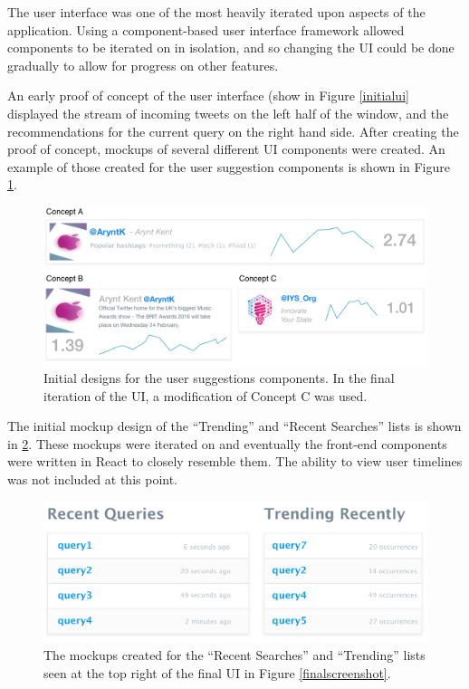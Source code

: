 \documentclass{l4proj}
\begin{document}
        The user interface was one of the most heavily iterated upon aspects of the application. Using a component-based user interface framework allowed components to be iterated on in isolation, and so changing the UI could be done gradually to allow for progress on other features.
        
        An early proof of concept of the user interface (show in Figure \ref{initialui} displayed the stream of incoming tweets on the left half of the window, and the recommendations for the current query on the right hand side. After creating the proof of concept, mockups of several different UI components were created. An example of those created for the user suggestion components is shown in Figure \ref{suggestionsmockups}.
        
\begin{figure}[H]
\centering
\includegraphics[scale=0.5]{suggestionsmockups.pdf}
\caption{Initial designs for the user suggestions components. In the final iteration of the UI, a modification of Concept C was used.}
\label{suggestionsmockups}
\end{figure}
        
        The initial mockup design of the ``Trending'' and ``Recent Searches'' lists is shown in \ref{listmockups}. These mockups were iterated on and eventually the front-end components were written in React to closely resemble them. The ability to view user timelines was not included at this point.
        
\begin{figure}[H]
\centering
\includegraphics[scale=0.5]{listmockups.pdf}
\caption{The mockups created for the ``Recent Searches'' and ``Trending'' lists seen at the top right of the final UI in Figure \ref{finalscreenshot}.}
\label{listmockups}
\end{figure}    
\end{document}
